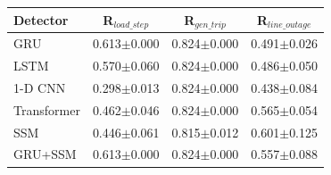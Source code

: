 \begin{tabular}{lccc}
\toprule
Detector & R$_{load\_step}$ & R$_{gen\_trip}$ & R$_{line\_outage}$ \\
\midrule
GRU & 0.613$\pm$0.000 & 0.824$\pm$0.000 & 0.491$\pm$0.026 \\
LSTM & 0.570$\pm$0.060 & 0.824$\pm$0.000 & 0.486$\pm$0.050 \\
1-D CNN & 0.298$\pm$0.013 & 0.824$\pm$0.000 & 0.438$\pm$0.084 \\
Transformer & 0.462$\pm$0.046 & 0.824$\pm$0.000 & 0.565$\pm$0.054 \\
SSM & 0.446$\pm$0.061 & 0.815$\pm$0.012 & 0.601$\pm$0.125 \\
GRU+SSM & 0.613$\pm$0.000 & 0.824$\pm$0.000 & 0.557$\pm$0.088 \\
\bottomrule
\end{tabular}